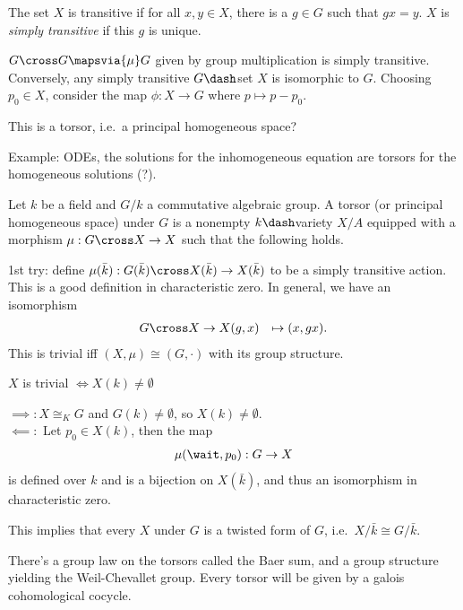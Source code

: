 The set \(X\) is transitive if for all \(x, y\in X\), there is a
\(g\in G\) such that \(gx = y\). \(X\) is \emph{simply transitive} if
this \(g\) is unique.

\begin{description}
\tightlist
\item[Exercise]
\(G\cross G \mapsvia{\mu} G\) given by group multiplication is simply
transitive. Conversely, any simply transitive \(G\dash\)set \(X\) is
isomorphic to \(G\). Choosing \(p_0 \in X\), consider the map
\(\phi: X\to G\) where \(p \mapsto p - p_0\).
\end{description}

This is a torsor, i.e.~a principal homogeneous space?

Example: ODEs, the solutions for the inhomogeneous equation are torsors
for the homogeneous solutions (?).

Let \(k\) be a field and \(G/k\) a commutative algebraic group. A torsor
(or principal homogeneous space) under \(G\) is a nonempty
\(k\dash\)variety \(X/A\) equipped with a morphism
\(\mu: G\cross X \to X\) such that the following holds.

1st try: define
\(\mu(\bar k): G(\bar k) \cross X(\bar k) \to X(\bar k)\) to be a simply
transitive action. This is a good definition in characteristic zero. In
general, we have an isomorphism \begin{align*}
G\cross X &\to X
(g, x) &\mapsto (x, gx)
.\end{align*} This is trivial iff \((X, \mu) \cong (G, \cdot)\) with its
group structure.

\begin{description}
\tightlist
\item[Claim]
\(X\) is trivial \(\iff X(k) \neq \emptyset\)
\item[Proof]
\(\implies: X \cong_K G\) and \(G(k) \neq \emptyset\), so
\(X(k)\neq \emptyset\).\\
\(\impliedby:\) Let \(p_0 \in X(k)\), then the map \begin{align*}
\mu(\wait, p_0): G \to X
\end{align*} is defined over \(k\) and is a bijection on \(X(\bar k)\),
and thus an isomorphism in characteristic zero.
\end{description}

This implies that every \(X\) under \(G\) is a twisted form of \(G\),
i.e.~\(X/\bar k \cong G/\bar k\).

There's a group law on the torsors called the Baer sum, and a group
structure yielding the Weil-Chevallet group. Every torsor will be given
by a galois cohomological cocycle.

